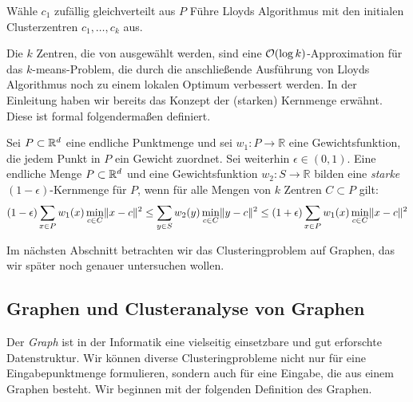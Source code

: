 \begin{algorithm}[H]
\label{algo:kmeanspp}
\caption{\kmpp}
	\DontPrintSemicolon
	
	\BlankLine
	
	Wähle $c_1$ zufällig gleichverteilt aus $P$\;
	Führe Lloyds Algorithmus mit den initialen Clusterzentren $c_1, \dots, c_k$ aus.
\end{algorithm}
Die $k$ Zentren, die von \kmpp{} ausgewählt werden, sind eine $\mathcal{O}(\log k)$-Approximation für das $k$-means-Problem, die durch
die anschließende Ausführung von Lloyds Algorithmus noch zu einem lokalen Optimum verbessert werden.
\absatz
In der Einleitung haben wir bereits das Konzept der (starken) Kernmenge erwähnt. Diese ist formal folgendermaßen definiert.
\begin{definition}
\label{def:strong-coreset}
	Sei $P \subset \mathbb{R}^{d}$ eine endliche Punktmenge und sei $w_1 : P \rightarrow \mathbb{R}$ eine Gewichtsfunktion, die jedem
	Punkt in $P$ ein Gewicht zuordnet. Sei weiterhin $\epsilon \in (0,1)$. Eine endliche Menge $P \subset \mathbb{R}^{d}$ und eine
	Gewichtsfunktion $w_2 : S \rightarrow \mathbb{R}$ bilden eine \emph{starke} $(1-\epsilon)$-Kernmenge für $P$, wenn
	für alle Mengen von $k$ Zentren $C \subset P$ gilt:
	\[ (1-\epsilon) \sum_{x \in P} w_1(x) \min_{c \in C} \lVert {x} - {c} \rVert^2 
		\leq \sum_{y \in S} w_2(y) \min_{c \in C} \lVert {y} - {c} \rVert^2
		\leq  (1+\epsilon) \sum_{x \in P} w_1(x) \min_{c \in C} \lVert {x} - {c} \rVert^2 \]
\end{definition}

Im nächsten Abschnitt betrachten wir das Clusteringproblem auf Graphen, das wir später noch genauer untersuchen wollen.

\subsection{Graphen und Clusteranalyse von Graphen}
\label{subsection:basics:graphs}

Der \emph{Graph} ist in der Informatik eine vielseitig einsetzbare und gut erforschte Datenstruktur. Wir können diverse
Clusteringprobleme nicht nur für eine Eingabepunktmenge formulieren, sondern auch für eine Eingabe, die aus einem Graphen
besteht. Wir beginnen mit der folgenden Definition des Graphen.


